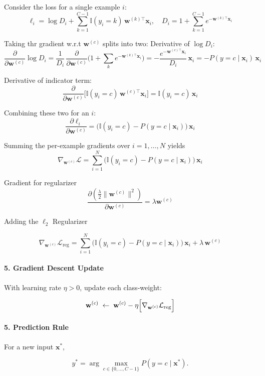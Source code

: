 \documentclass{article}
\begin{document}
Consider the loss for a single example \(i\):
\[
\ell_i
=\log D_i
+\sum_{k=1}^{C-1}\mathbb{I}(y_i=k)\,\mathbf{w}^{(k)\top}\mathbf{x}_i,
\quad
D_i = 1 + \sum_{k=1}^{C-1}e^{-\mathbf{w}^{(k)\top}\mathbf{x}_i}
\]

Taking thr gradient w.r.t \(\mathbf{w}^{(c)}\) splits into two:
Derivative of \(\log D_i\):
\[
\frac{\partial}{\partial \mathbf{w}^{(c)}}\log D_i
=\frac{1}{D_i}\,
\frac{\partial}{\partial \mathbf{w}^{(c)}}
\bigl(1 + \sum_{k}e^{-\mathbf{w}^{(k)\top}\mathbf{x}_i}\bigr)
=-\frac{e^{-\mathbf{w}^{(c)\top}\mathbf{x}_i}}{D_i}\,\mathbf{x}_i
=-P(y=c\mid \mathbf{x}_i)\,\mathbf{x}_i
\]

Derivative of indicator term:
\[
\frac{\partial}{\partial \mathbf{w}^{(c)}}
\bigl[\mathbb{I}(y_i=c)\,\mathbf{w}^{(c)\top}\mathbf{x}_i\bigr]
=\mathbb{I}(y_i=c)\,\mathbf{x}_i
\]

Combining these two for an \(i\):
\[
\frac{\partial \ell_i}{\partial \mathbf{w}^{(c)}}
=
\bigl(\mathbb{I}(y_i=c)-P(y=c\mid \mathbf{x}_i)\bigr)\,\mathbf{x}_i
\]


Summing the per-example gradients over \(i=1,\dots,N\) yields 
\[
\nabla_{\mathbf{w}^{(c)}}\mathcal{L}
=
\sum_{i=1}^N
\bigl(\mathbb{I}(y_i=c)-P(y=c\mid \mathbf{x}_i)\bigr)\,\mathbf{x}_i
\]

Gradient for regularizer
\[
\frac{\partial (\frac{\lambda}{2}\bigl\|\mathbf{w}^{(c)}\bigr\|^2)}
{\partial \mathbf{w}^{(c)}}
= \lambda\mathbf{w}^{(c)}
\]

Adding the \(\ell_2\) Regularizer

\[
\nabla_{\mathbf{w}^{(c)}}\mathcal{L}_{\mathrm{reg}}
=
\sum_{i=1}^N
\bigl(\mathbb{I}(y_i=c)-P(y=c\mid \mathbf{x}_i)\bigr)\,\mathbf{x}_i
+\lambda\,\mathbf{w}^{(c)}
\]


\paragraph{5. Gradient Descent Update}
With learning rate \(\eta>0\), update each class‐weight:


\[
\mathbf{w}^{(c)} \;\leftarrow\;
\mathbf{w}^{(c)}
-\eta\Bigl[\nabla_{\mathbf{w}^{(c)}}\mathcal{L}_{\mathrm{reg}}\Bigr]
\]



\paragraph{5. Prediction Rule}
For a new input \(\mathbf{x}^*\),


\[
y^*
=
\arg\max_{c\in\{0,\dots,C-1\}}P(y=c\mid \mathbf{x}^*).
\]
\end{document}
